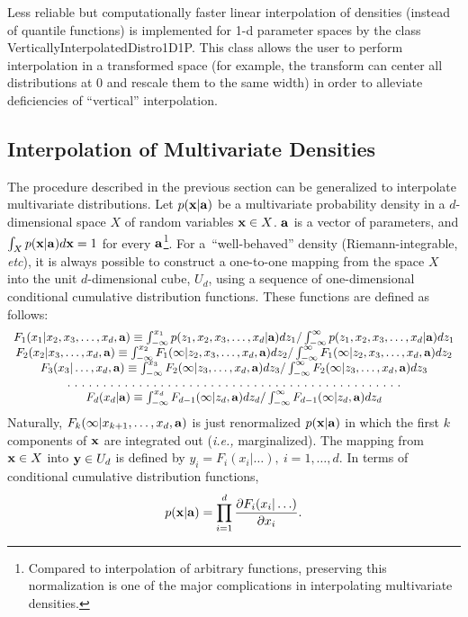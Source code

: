 \documentclass[12pt,titlepage]{article}
\newcommand{\cname}[1]{\index{#1}\textsf{#1}}
\begin{document}
Less reliable but computationally faster linear interpolation of densities (instead of
quantile functions) is implemented for 1-d parameter spaces by the
class \cname{VerticallyInterpolatedDistro1D1P}. This class allows
the user to perform interpolation in a transformed space (for example,
the transform can center all distributions at 0 and rescale them to
the same width) in order to alleviate deficiencies of ``vertical''
interpolation.


\subsection{Interpolation of Multivariate Densities}
\label{sec:interpolatemultivar}

The procedure described in the previous section can be
generalized to interpolate multivariate distributions.
Let $p({\bf x}|{\bf a})$ be a multivariate probability density
in a $d$-dimensional space $X$ of random variables ${\bf x} \in X$.
${\bf a}$ is a vector of parameters, and
$\int_{X} p({\bf x}|{\bf a}) d {\bf x} = 1$ 
for every ${\bf a}$\footnote{Compared to interpolation of
arbitrary functions, preserving this normalization is one of the
major complications in interpolating multivariate densities.}.
For a~``well-behaved'' density (Riemann-integrable, {\it etc}),
it is always possible to construct a one-to-one
mapping from the space $X$
into the unit $d$-dimensional cube, $U_d$, using a sequence of one-dimensional
conditional cumulative distribution functions. These functions are defined
as follows:
$$
\begin{array}{c}
F_{1}(x_1|x_2, x_3, \ldots, x_d, {\bf a}) \equiv \int_{-\infty}^{x_1} p(z_1, x_2, x_3, \ldots, x_d | {\bf a}) d z_1 / 
\int_{-\infty}^{\infty} p(z_1, x_2, x_3, \ldots, x_d | {\bf a}) d z_1
\\
F_{2}(x_2 | x_3, \ldots, x_d, {\bf a}) \equiv \int_{-\infty}^{x_2} F_{1}(\infty | z_2, x_3, \ldots, x_d, {\bf a}) d z_2 /
\int_{-\infty}^{\infty} F_{1}(\infty | z_2, x_3, \ldots, x_d, {\bf a}) d z_2
\\
F_{3}(x_3 | \ldots, x_d, {\bf a}) \equiv \int_{-\infty}^{x_3} F_{2}(\infty | z_3, \ldots, x_d, {\bf a}) d z_3 /
\int_{-\infty}^{\infty} F_{2}(\infty | z_3, \ldots, x_d, {\bf a}) d z_3
\\
.\ .\ .\ .\ .\ .\ .\ .\ .\ .\ .\ .\ .\ .\ .\ .\ .\ .\ .\ .\ .\ .\ .\ .\ .\ .\ .\ .\ .\ .\ .\ .\ .\ .\ .\ .\ .\ .\ .\ .\ .\ .\ .\ .\ .\ .\ .
\\
F_{d}(x_d | {\bf a}) \equiv \int_{-\infty}^{x_d} F_{d-1}(\infty | z_d, {\bf a}) d z_d /
\int_{-\infty}^{\infty} F_{d-1}(\infty | z_d, {\bf a}) d z_d
\end{array}
$$
Naturally, $F_{k}(\infty | x_{k+1}, \ldots, x_d, {\bf a})$ is just renormalized $p({\bf x}|{\bf a})$
in which the first $k$ components of ${\bf x}$ are integrated out ({\it i.e.,} marginalized).
The mapping from ${\bf x} \in X$ into ${\bf y} \in U_d$ is defined by $y_i = F_i(x_i | \ldots), \ i = 1, \ldots, d$. In terms of conditional cumulative distribution functions,
$$
p({\bf x}|{\bf a}) = \prod_{i=1}^{d}{\frac{\partial F_i(x_i | \ldots)}{\partial x_i}}.
$$
\end{document}
